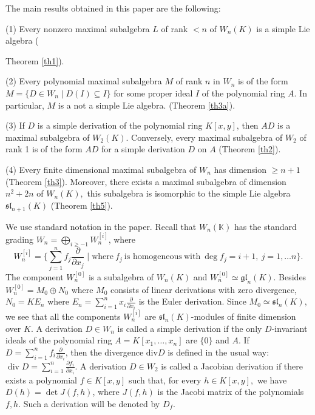 \documentclass[12pt,a4paper]{amsart}
\theoremstyle{plain}
\theoremstyle{definition}
\begin{document}
The main results obtained in this paper are the following:

(1) Every nonzero maximal subalgebra $L$ of rank $<n$ of $W_n(K)$ is a simple Lie algebra ({Theorem \ref{th1}).
	
	(2)		Every polynomial maximal  subalgebra $M$ of rank $n$ in $W_n$ is of the form $M=\{ D \in W_n \mid D(I) \subseteq I \}$ for some proper ideal $I$ of the polynomial ring $A.$ In particular,   $M$ is a not a simple Lie algebra. (Theorem \ref{th3a}).		
	
	(3) If $D$ is a simple derivation of the polynomial ring $K[x, y]$, then $AD$ is a maximal subalgebra of $W_2(K).$ Conversely, every maximal subalgebra of $W_2$ of rank 1 is of the form $AD$ for a simple derivation $D$ on $A$ (Theorem \ref{th2}).
	
	(4) Every finite dimensional maximal subalgebra of $W_n$ has dimension  $\ge n+1$ (Theorem \ref{th3}). Moreover, there exists a maximal subalgebra of dimension $n^2 + 2n$ of $W_n(K),$  this subalgebra is isomorphic to the simple Lie algebra $\mathfrak{sl}_{n+1}(K)$ (Theorem \ref{th5}).
	
	We use standard notation in the paper.  Recall that $W_n(\mathbb{K})$ has the standard grading
	${W_n = \bigoplus_{i \ge -1} W_n^{[i]}}$, where
	$$W_n^{[i]} = \{ \sum_{j=1}^n f_j \frac{\partial}{\partial x_j} \mid   \text{where} \ f_j  \ \text{is homogeneous}  \ \text{with} \   \deg f_j = i+1, \ j=1,\ldots n  \}.$$
	The component $W_n^{[0]}$ is a subalgebra of $W_n(K)$ and $W_n^{[0]} \simeq \mathfrak{gl}_n({K})$. Besides $W_n^{[0]} = M_0 \oplus N_0$ where $M_0$ consists of linear derivations with zero divergence, $N_0 = KE_n$ where $E_n = \sum_{i=1}^n x_i \frac{\partial}{\partial x_i}$ is the Euler derivation. Since $M_0 \simeq \mathfrak{sl}_n(K)$, we see that all the components $W_n^{[i]}$ are 
	$\mathfrak{sl}_n(K)$-modules of finite dimension over ${K}$. A derivation $D\in W_n $	is called a simple derivation if the only $D$-invariant ideals of the polynomial ring $A=K[x_1, \ldots , x_n]$ are $\{ 0\}$ and $A.$
	If $D = \sum _{i=1}^nf_i \frac{\partial}{\partial x_i}$, then the divergence $\text{div} D$ is defined in the usual way: $\operatorname{div} D = \sum_{i=1}^n \frac{\partial f_i}{\partial x_i}$. 
	A derivation $D\in W_2$ is called a Jacobian derivation if there exists a polynomial $f\in K[x, y]$ such that, for every $h\in K[x, y],$ we have $D(h)=\det J(f, h)$, where $J(f, h)$ is the Jacobi matrix of the polynomials $f, h.$ Such a derivation will be denoted by  $D_f.$  
	
}
\end{document}
